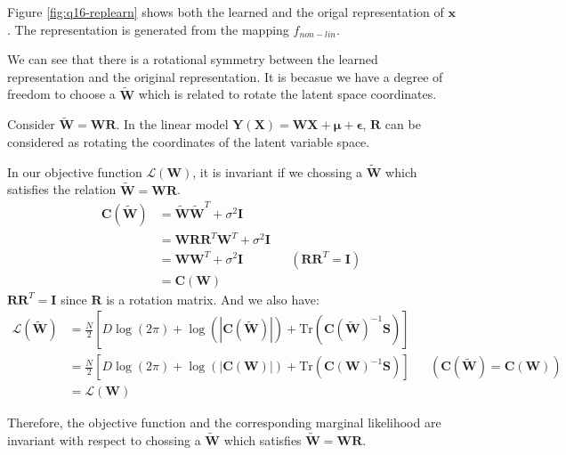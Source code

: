\documentclass[12pt]{article}
\newenvironment{question}[2][Question]{\begin{trivlist}
\kern10pt
\item[\hskip \labelsep {\bfseries #1}\hskip \labelsep {\bfseries #2.}]}{\end{trivlist}}
\begin{document}
\begin{question}{16}
Figure \ref{fig:q16-replearn} shows both the learned and the origal 
representation of $\mathbf{x}$.
The representation is generated from the mapping $f_{non-lin}$.

We can see that there is a rotational symmetry between the learned representation
and the original representation. It is becasue we have a degree of freedom to choose
a $\widetilde{\mathbf{W}}$ which is related to rotate the latent space coordinates.

Consider $\widetilde{\mathbf{W}} = \mathbf{WR}$. In the linear model 
$\mathbf{Y}(\mathbf{X}) = \mathbf{WX} + \bm{\mu} + \bm{\epsilon}$, 
$\mathbf{R}$ can be considered as rotating the coordinates of the 
latent variable space.

In our objective function $\mathcal{L}(\mathbf{W})$, it is invariant if we chossing
a $\widetilde{\mathbf{W}}$ which satisfies the relation $\widetilde{\mathbf{W}} = \mathbf{WR}$.
  \begin{align*}
    \mathbf{C}(\widetilde{\mathbf{W}}) 
      &= \widetilde{\mathbf{W}}\widetilde{\mathbf{W}}^T + \sigma^2\mathbf{I} \\
      &= \mathbf{W}\mathbf{R}\mathbf{R}^T\mathbf{W}^T + \sigma^2\mathbf{I} \\
      &= \mathbf{W}\mathbf{W}^T + \sigma^2\mathbf{I}
        && (\mathbf{R}\mathbf{R}^T = \mathbf{I}) \\
      &= \mathbf{C}(\mathbf{W})
  \end{align*}
$\mathbf{R}\mathbf{R}^T = \mathbf{I}$ since $\mathbf{R}$ is a rotation matrix.
And we also have:
  \begin{align*}
    \mathcal{L}(\widetilde{\mathbf{W}})
      &= \frac{N}{2}[D\log(2\pi) 
        + \log(|\mathbf{C}(\widetilde{\mathbf{W}})|) 
        + \text{Tr}(\mathbf{C}(\widetilde{\mathbf{W}})^{-1}\mathbf{S})] \\
      &= \frac{N}{2}[D\log(2\pi) 
        + \log(|\mathbf{C}(\mathbf{W})|) 
        + \text{Tr}(\mathbf{C}(\mathbf{W})^{-1}\mathbf{S})]
        && (\mathbf{C}(\widetilde{\mathbf{W}}) = \mathbf{C}(\mathbf{W})) \\
      &= \mathcal{L}(\mathbf{W})
  \end{align*}

Therefore, the objective function and the corresponding marginal likelihood
are invariant with respect to chossing a $\widetilde{\mathbf{W}}$ which satisfies
$\widetilde{\mathbf{W}} = \mathbf{WR}$.


\end{question}
\end{document}
